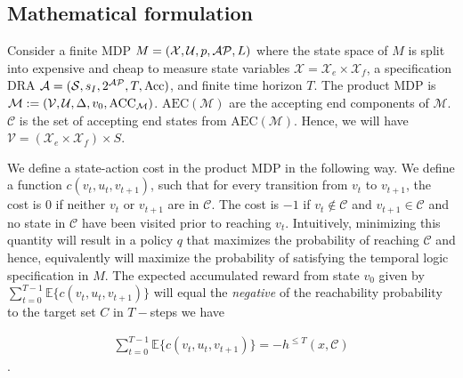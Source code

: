 \subsection{Mathematical formulation}
Consider a finite MDP $M=(\mathcal{X},\mathcal{U},p,\mathcal{AP},L)$ where the state space of $M$ is split into expensive and cheap to measure state variables $\mathcal{X} = \mathcal{X}_e \times \mathcal{X}_f$, a specification DRA $\mathcal{A} = (\mathcal{S},s_I,2^{\mathcal{AP}}, T,\textrm{Acc})$, and finite time horizon $T$. The product MDP is $\mathcal{M}:= (\mathcal{V},\mathcal{U}, \Delta,v_0,\textrm{ACC}_{\mathcal{M}})$. $\textrm{AEC}(\mathcal{M})$ are the accepting end components of $\mathcal{M}$. $\mathcal{C}$ is the set of accepting end states from $\textrm{AEC}(\mathcal{M})$.  Hence, we will have $\mathcal{V} = (\mathcal{X}_e \times \mathcal{X}_f) \times S$. 

We define a state-action cost in the product MDP in the following way. We define a function $c(v_t,u_t,v_{t+1})$, such that for every transition from $v_t$ to $v_{t+1}$, the cost is $0$ if neither $v_t$ or $v_{t+1}$ are in $\mathcal{C}$. The cost is $-1$ if $v_t \notin \mathcal{C}$ and $v_{t+1} \in \mathcal{C}$ and no state in $\mathcal{C}$ have been visited prior to reaching $v_t$.  Intuitively, minimizing this quantity will result in a policy $q$ that maximizes the probability of reaching $\mathcal{C}$ and hence, equivalently will maximize the probability of satisfying the temporal logic specification in $M$. The expected accumulated reward from state $v_0$ given by $\sum_{t=0}^{T-1}\mathbb{E}\{c(v_t,u_t,v_{t+1})\}$ will equal the \emph{negative} of the reachability probability to the target set $C$ in $T-$steps \ie we have

\begin{align*}
\sum_{t=0}^{T-1}\mathbb{E}\{c(v_t,u_t,v_{t+1})\} = -h^{\leq T}(x,\mathcal{C})
\end{align*}.


